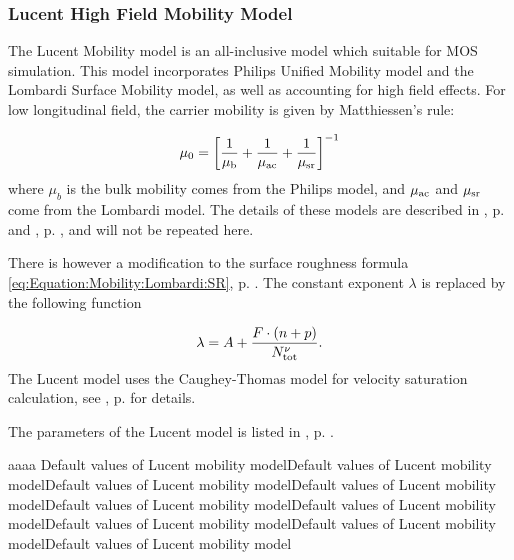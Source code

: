 \documentclass[oneside,12pt]{cgd_book}
\begin{document}
\subsubsection{Lucent High Field Mobility Model}
\label{sec:Equation:Mobility:Unified:Lucent}
The Lucent Mobility model \cite[Darwish1997]{}
is an all-inclusive model which
          suitable for MOS simulation. This model incorporates Philips Unified Mobility model and the Lombardi Surface
          Mobility model, as well as accounting for high field effects. For low longitudinal field, the carrier mobility
          is given by Matthiessen's rule:
\par
\begin{equation}
\mu_{0} = \left[ \frac{1}{\mu_{\rm b}} + \frac{1}{\mu_{\rm ac} } + \frac{1}{\mu_{\rm sr} }
            \right]^{-1}
\end{equation}
where $\mu_b$ is the bulk mobility comes from the Philips model, and
$\mu_{\rm ac}$ and $\mu_{\rm sr}$ come from the Lombardi
          model. The details of these models are described in ,
p. \pageref{sec:Equation:Mobility:Bulk:Philips} and ,
p. \pageref{sec:Equation:Mobility:Unified:Lombardi}, and will not be repeated here.
\par
There is however a modification to the surface roughness formula
\eqref{eq:Equation:Mobility:Lombardi:SR}, p. \pageref{eq:Equation:Mobility:Lombardi:SR}. The constant exponent
$\lambda$ is
          replaced by the following function
\par
\begin{equation}
\lambda = A + \dfrac{ F\cdot (n+p) } { N_{\rm tot} ^ \nu }.
\end{equation}
The Lucent model uses the Caughey-Thomas model for velocity saturation calculation, see
, p. \pageref{sec:Equation:Mobility:Bulk:VSat}
for details.
\par
The parameters of the Lucent model is listed in ,
p. \pageref{tab:Equation:Mobility:Lucent:Param}.
\par
\begin{widetext}
aaaa Default values of Lucent mobility modelDefault values of Lucent mobility modelDefault values of Lucent mobility modelDefault values of Lucent mobility modelDefault values of Lucent mobility modelDefault values of Lucent mobility modelDefault values of Lucent mobility modelDefault values of Lucent mobility modelDefault values of Lucent mobility model
\end{widetext}
\end{document}
